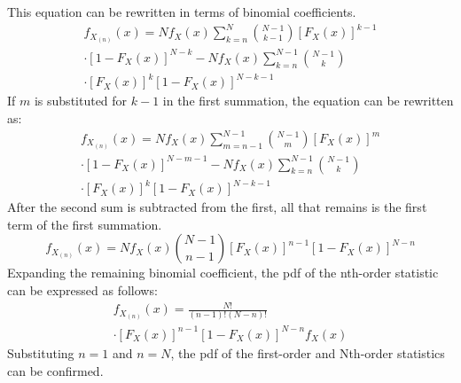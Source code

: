 \documentclass[conference]{IEEEtran}
\begin{document}
This equation can be rewritten in terms of binomial coefficients.
\begin{equation}
\begin{gathered}
f_{X_{(n)}}(x) = Nf_X(x)\sum_{k=n}^{N}\binom{N-1}{k-1}[F_X(x)]^{k-1}\\
\cdot[1-F_X(x)]^{N-k} - Nf_X(x)\sum_{k=n}^{N-1}\binom{N-1}{k}\\
\cdot[F_X(x)]^{k}[1-F_X(x)]^{N-k-1}
\end{gathered}
\end{equation}
If $m$ is substituted for $k-1$ in the first summation, the equation can be rewritten as:
\begin{equation}
\begin{gathered}
f_{X_{(n)}}(x) = Nf_X(x)\sum_{m=n-1}^{N-1}\binom{N-1}{m}[F_X(x)]^{m}\\
\cdot[1-F_X(x)]^{N-m-1} - Nf_X(x)\sum_{k=n}^{N-1}\binom{N-1}{k}\\
\cdot[F_X(x)]^{k}[1-F_X(x)]^{N-k-1}
\end{gathered}
\end{equation}
After the second sum is subtracted from the first, all that remains is the first term of the first summation.
\begin{equation}
f_{X_{(n)}}(x) = Nf_X(x)\binom{N-1}{n-1}[F_X(x)]^{n-1}[1-F_X(x)]^{N-n}
\end{equation}
Expanding the remaining binomial coefficient, the pdf of the nth-order statistic can be expressed as follows:
\begin{equation}
\begin{gathered}
f_{X_{(n)}}(x) = \frac{N!}{(n-1)!(N-n)!}\\
\cdot[F_X(x)]^{n-1}[1-F_X(x)]^{N-n}f_X(x)
\end{gathered}
\end{equation}
Substituting $n=1$ and $n=N$, the pdf of the first-order and Nth-order statistics can be confirmed. 
\end{document}
